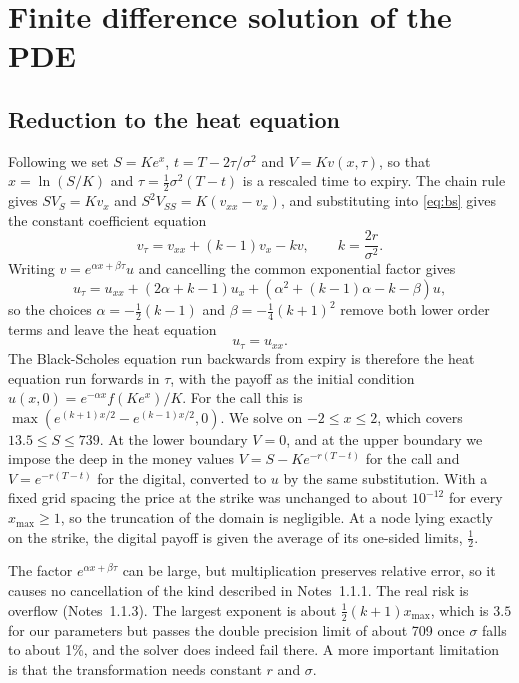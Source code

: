 \documentclass[11pt,a4paper]{article}
\begin{document}
\section{Finite difference solution of the PDE}\label{sec:pde}

\subsection{Reduction to the heat equation}

Following \citet{wilmott1995} we set $S = Ke^x$, $t = T - 2\tau/\sigma^2$ and $V = Kv(x,\tau)$, so that $x = \ln(S/K)$ and $\tau = \frac{1}{2}\sigma^2(T-t)$ is a rescaled time to expiry. The chain rule gives $SV_S = Kv_x$ and $S^2V_{SS} = K(v_{xx} - v_x)$, and substituting into \eqref{eq:bs} gives the constant coefficient equation
\begin{equation}
v_\tau = v_{xx} + (k-1)v_x - kv, \qquad k = \frac{2r}{\sigma^2}.
\end{equation}
Writing $v = e^{\alpha x + \beta\tau}u$ and cancelling the common exponential factor gives
\begin{equation}
u_\tau = u_{xx} + (2\alpha + k - 1)u_x + \left(\alpha^2 + (k-1)\alpha - k - \beta\right)u,
\end{equation}
so the choices $\alpha = -\frac{1}{2}(k-1)$ and $\beta = -\frac{1}{4}(k+1)^2$ remove both lower order terms and leave the heat equation
\begin{equation}
u_\tau = u_{xx}. \label{eq:heat}
\end{equation}
The Black-Scholes equation run backwards from expiry is therefore the heat equation run forwards in $\tau$, with the payoff as the initial condition $u(x,0) = e^{-\alpha x}f(Ke^x)/K$. For the call this is $\max(e^{(k+1)x/2} - e^{(k-1)x/2}, 0)$. We solve on $-2 \le x \le 2$, which covers $13.5 \le S \le 739$. At the lower boundary $V = 0$, and at the upper boundary we impose the deep in the money values $V = S - Ke^{-r(T-t)}$ for the call and $V = e^{-r(T-t)}$ for the digital, converted to $u$ by the same substitution. With a fixed grid spacing the price at the strike was unchanged to about $10^{-12}$ for every $x_{\max} \ge 1$, so the truncation of the domain is negligible. At a node lying exactly on the strike, the digital payoff is given the average of its one-sided limits, $\frac{1}{2}$.

The factor $e^{\alpha x + \beta\tau}$ can be large, but multiplication preserves relative error, so it causes no cancellation of the kind described in Notes~1.1.1. The real risk is overflow (Notes~1.1.3). The largest exponent is about $\frac{1}{2}(k+1)x_{\max}$, which is $3.5$ for our parameters but passes the double precision limit of about 709 once $\sigma$ falls to about 1\%, and the solver does indeed fail there. A more important limitation is that the transformation needs constant $r$ and $\sigma$.
\end{document}

